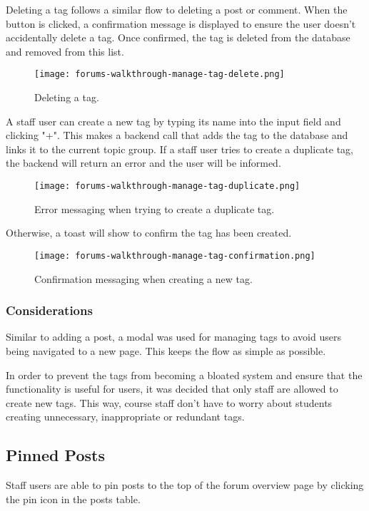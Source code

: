 Deleting a tag follows a similar flow to deleting a post or comment.
When the button is clicked, a confirmation message is displayed to ensure the user doesn't accidentally delete a tag.
Once confirmed, the tag is deleted from the database and removed from this list.

\begin{figure}[h!]
    \texttt{[image: forums-walkthrough-manage-tag-delete.png]}
    \centering
    \caption{Deleting a tag.}
\end{figure}

A staff user can create a new tag by typing its name into the input field and clicking "+".
This makes a backend call that adds the tag to the database and links it to the current topic group.
If a staff user tries to create a duplicate tag, the backend will return an error and the user will be informed.

\begin{figure}[h!]
    \texttt{[image: forums-walkthrough-manage-tag-duplicate.png]}
    \centering
    \caption{Error messaging when trying to create a duplicate tag.}
\end{figure}

Otherwise, a toast will show to confirm the tag has been created.

\begin{figure}[h!]
    \texttt{[image: forums-walkthrough-manage-tag-confirmation.png]}
    \centering
    \caption{Confirmation messaging when creating a new tag.}
\end{figure}

\subsubsection{Considerations}
Similar to adding a post, a modal was used for managing tags to avoid users being navigated to a new page.
This keeps the flow as simple as possible.

In order to prevent the tags from becoming a bloated system and ensure that the functionality is useful for users, it was decided that only staff are allowed to create new tags.
This way, course staff don't have to worry about students creating unnecessary, inappropriate or redundant tags.

\subsection{Pinned Posts}
Staff users are able to pin posts to the top of the forum overview page by clicking the pin icon in the posts table.

